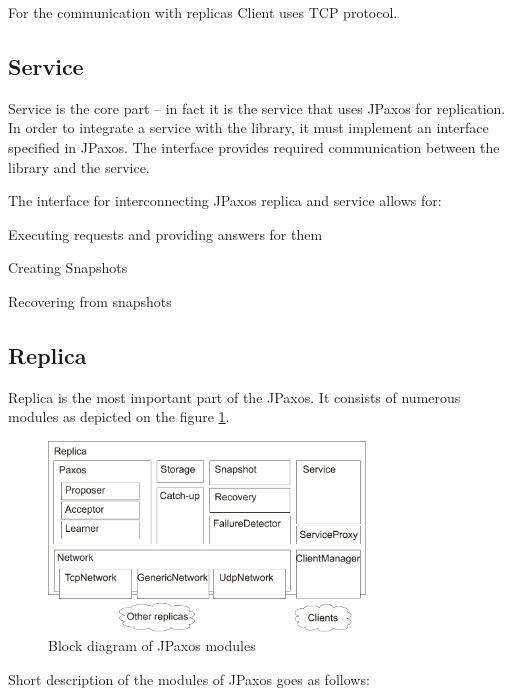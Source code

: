 \noindent For the communication with replicas Client uses TCP protocol.

\subsection{Service}

Service is the core part -- in fact it is the service that uses JPaxos for replication.
In order to integrate a service with the library, it must implement an interface specified in JPaxos. The interface provides required communication between the library and the service.

The interface for interconnecting JPaxos replica and service allows for:
\begin{tightList}
 \item[\textbullet] Executing requests and providing answers for them
 \item[\textbullet] Creating Snapshots
 \item[\textbullet] Recovering from snapshots
\end{tightList}

\subsection{Replica}

Replica is the most important part of the JPaxos. It consists of numerous modules as depicted on the figure \ref{fig:replica_architecture}.

\begin{figure}[h]
 \centering
 \includegraphics[keepaspectratio, width=0.75\textwidth]{architecture/replica_architecture.pdf}
 \caption{Block diagram of JPaxos modules}
 \label{fig:replica_architecture}
\end{figure}

Short description of the modules of JPaxos goes as follows:

